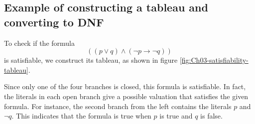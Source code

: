 \subsection{Example of constructing a tableau and converting to DNF}

To check if the formula
%
\[((p \lor q) \land (\neg p \rightarrow \neg q))\]
%
is satisfiable, we construct its tableau, as shown in figure \ref{fig:Ch03-satisfiability-tableau}.

Since only one of the four branches is closed, this formula is satisfiable. In fact, the literals in each open branch give a possible valuation that satisfies the given formula. For instance, the second branch from the left contains the literals \(p\) and \(\neg q\). This indicates that the formula is true when \(p\) is true and \(q\) is false.

